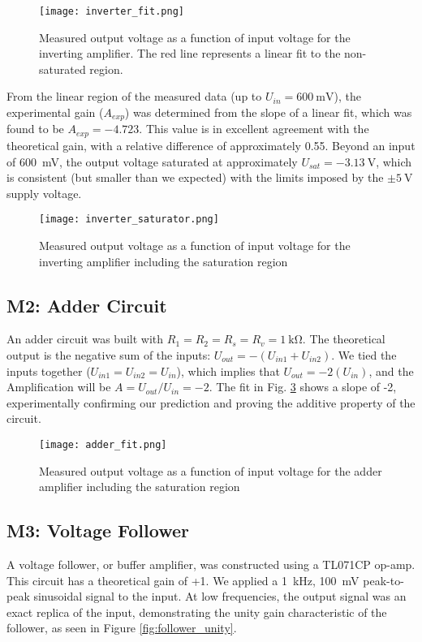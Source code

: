 \documentclass[12pt,a4paper]{article}
\begin{document}
\begin{figure}[H]
    \centering
    \texttt{[image: inverter\_fit.png]} %
    \caption{Measured output voltage as a function of input voltage for the inverting amplifier. The red line represents a linear fit to the non-saturated region.}
    \label{fig:inverting_amp_gain}
\end{figure}

From the linear region of the measured data (up to \(U_{in} = \SI{600}{\milli\volt}\)), the experimental gain (\(A_{exp}\)) was determined from the slope of a linear fit, which was found to be \(A_{exp} = -4.723\). This value is in excellent agreement with the theoretical gain, with a relative difference of approximately 0.55. Beyond an input of \SI{600}{\milli\volt}, the output voltage saturated at approximately \(U_{sat} = \SI{-3.13}{\volt}\), which is consistent (but smaller than we expected) with the limits imposed by the \(\pm\SI{5}{\volt}\) supply voltage.

\begin{figure}[H]
    \centering
    \texttt{[image: inverter\_saturator.png]} %
    \caption{Measured output voltage as a function of input voltage for the inverting amplifier including the saturation region}
    \label{fig:inverting_amp_saturated}
\end{figure}

\subsection{M2: Adder Circuit}
An adder circuit was built with \(R_1 = R_2 = R_s = R_v = \SI{1}{\kilo\ohm}\). The theoretical output is the negative sum of the inputs: \(U_{out} = -(U_{in1} + U_{in2})\). We tied the inputs together (\(U_{in1} = U_{in2} = U_{in}\)), which implies that \(U_{out} = -2(U_{in})\), and the Amplification will be \(A = U_{out}/U_{in} = -2\). The fit in Fig. \ref{fig:adder} shows a slope of -2, experimentally confirming our prediction and proving the additive property of the circuit.

\begin{figure}[H]
    \centering
    \texttt{[image: adder\_fit.png]} %
    \caption{Measured output voltage as a function of input voltage for the adder amplifier including the saturation region}
    \label{fig:adder}
\end{figure}

\subsection{M3: Voltage Follower}
A voltage follower, or buffer amplifier, was constructed using a TL071CP op-amp. This circuit has a theoretical gain of +1. We applied a \SI{1}{\kilo\hertz}, \SI{100}{\milli\volt} peak-to-peak sinusoidal signal to the input. At low frequencies, the output signal was an exact replica of the input, demonstrating the unity gain characteristic of the follower, as seen in Figure \ref{fig:follower_unity}.
\end{document}
